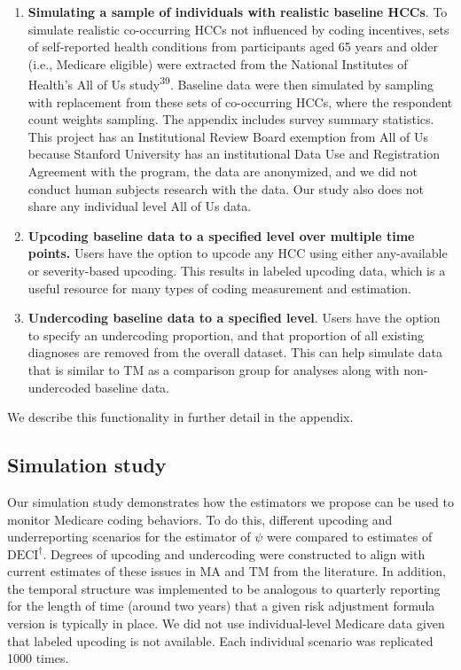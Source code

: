 \documentclass[
  12pt,
  number]{elsarticle}
\begin{document}
\begin{enumerate}
\def\labelenumi{\arabic{enumi}.}
\item
  \textbf{Simulating a sample of individuals with realistic baseline
  HCCs}. To simulate realistic co-occurring HCCs not influenced by
  coding incentives, sets of self-reported health conditions from
  participants aged 65 years and older (i.e., Medicare eligible) were
  extracted from the National Institutes of Health's All of Us
  study\textsuperscript{39}. Baseline data were then simulated by
  sampling with replacement from these sets of co-occurring HCCs, where
  the respondent count weights sampling. The appendix includes survey
  summary statistics. This project has an Institutional Review Board
  exemption from All of Us because Stanford University has an
  institutional Data Use and Registration Agreement with the program,
  the data are anonymized, and we did not conduct human subjects
  research with the data. Our study also does not share any individual
  level All of Us data.
\item
  \textbf{Upcoding baseline data to a specified level over multiple time
  points.} Users have the option to upcode any HCC using either
  any-available or severity-based upcoding. This results in labeled
  upcoding data, which is a useful resource for many types of coding
  measurement and estimation.
\item
  \textbf{Undercoding baseline data to a specified level}. Users have
  the option to specify an undercoding proportion, and that proportion
  of all existing diagnoses are removed from the overall dataset. This
  can help simulate data that is similar to TM as a comparison group for
  analyses along with non-undercoded baseline data.
\end{enumerate}

We describe this functionality in further detail in the appendix.

\subsection{Simulation study}\label{sec-simulation-study}

Our simulation study demonstrates how the estimators we propose can be
used to monitor Medicare coding behaviors. To do this, different
upcoding and underreporting scenarios for the estimator of \(\psi\) were
compared to estimates of \(\text{DECI}^\dagger\). Degrees of upcoding
and undercoding were constructed to align with current estimates of
these issues in MA and TM from the literature. In addition, the temporal
structure was implemented to be analogous to quarterly reporting for the
length of time (around two years) that a given risk adjustment formula
version is typically in place. We did not use individual-level Medicare
data given that labeled upcoding is not available. Each individual
scenario was replicated 1000 times.
\end{document}

